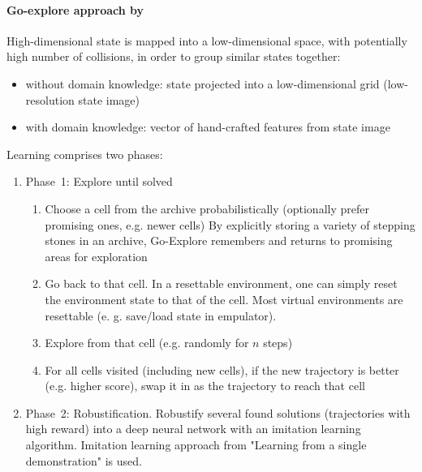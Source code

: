 \documentclass[acmsmall, nonacm]{acmart}
\begin{document}

\paragraph{Go-explore approach by~\citet{ecoffet_first_2021}} %
\label{par:go-explore}

High-dimensional state is mapped into a low-dimensional space, with potentially high number of collisions, in order to group similar states together:
\begin{itemize}
    \item without domain knowledge: state projected into a low-dimensional grid (low-resolution state image)
    \item with domain knowledge: vector of hand-crafted features from state image
\end{itemize}

Learning comprises two phases:
\begin{enumerate}
    \item Phase~1: Explore until solved
    \begin{enumerate}
      \item Choose a cell from the archive probabilistically (optionally prefer promising ones, e.g. newer cells)
    By explicitly storing a variety of stepping stones in an archive, Go-Explore remembers and returns to promising areas for exploration
      \item Go back to that cell. In a resettable environment, one can simply reset the environment state to that of the cell. Most virtual environments are resettable (e. g. save/load state in empulator).
      \item Explore from that cell (e.g. randomly for $n$ steps)
      \item For all cells visited (including new cells), if the new trajectory is better (e.g. higher score), swap it in as the trajectory to reach that cell
    \end{enumerate}

    \item Phase~2: Robustification. Robustify several found solutions (trajectories with high reward) into a deep neural network with an imitation learning algorithm. Imitation learning approach from "Learning from a single demonstration" is used.
\end{enumerate}

\end{document}
